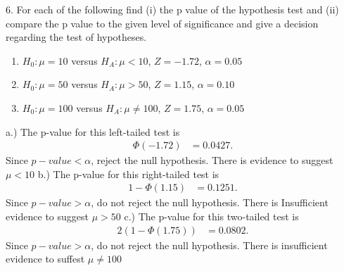 \documentclass{report}
\begin{document}
\pagebreak \bigbreak \noindent 
\begin{mdframed}
6. For each of the following find (i) the p value of the hypothesis test and (ii) compare the p value to the given level of significance and give a decision regarding the test of hypotheses.
\begin{enumerate}[label=(\alph*)]
    \item \( H_0: \mu = 10 \) versus \( H_A: \mu < 10 \), \( Z = -1.72 \), \(\alpha = 0.05\)
    \item \( H_0: \mu = 50 \) versus \( H_A: \mu > 50 \), \( Z = 1.15 \), \(\alpha = 0.10\)
    \item \( H_0: \mu = 100 \) versus \( H_A: \mu \neq 100 \), \( Z = 1.75 \), \(\alpha = 0.05\)
\end{enumerate}
\end{mdframed}
\bigbreak \noindent 
a.) The p-value for this left-tailed test is 
\begin{align*}
    \Phi(-1.72) &= 0.0427
.\end{align*}
Since $p-value < \alpha$, reject the null hypothesis. There is evidence to suggest $\mu < 10$
\bigbreak \noindent 
b.) The p-value for this right-tailed test is 
\begin{align*}
    1-\Phi(1.15) &= 0.1251
.\end{align*}
\bigbreak \noindent 
Since $p-value > \alpha$, do not reject the null hypothesis. There is Insufficient evidence to suggest $\mu > 50$ 
\bigbreak \noindent 
c.) The p-value for this two-tailed test is
\begin{align*}
    2(1-\Phi(1.75)) &= 0.0802
.\end{align*}
\bigbreak \noindent 
Since $p-value > \alpha$, do not reject the null hypothesis. There is insufficient evidence to suffest $\mu \ne 100$



 
\end{document}
